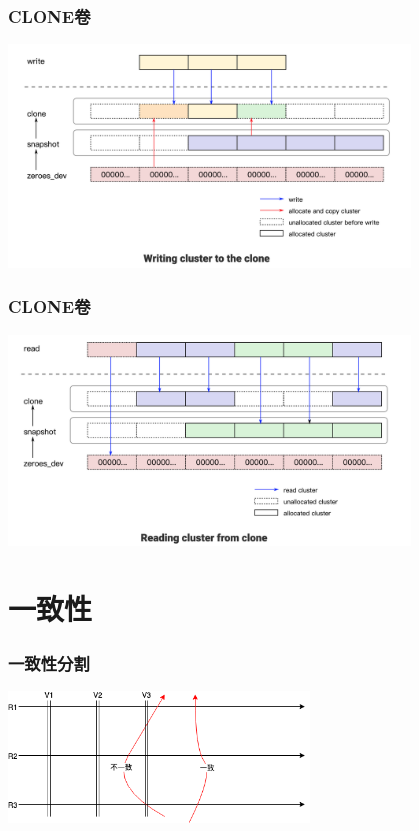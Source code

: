 \documentclass[UTF8,8pt,xcolor=dvipsnames]{beamer}
\begin{document}
\begin{frame}[fragile]
    \frametitle{CLONE卷}
    \begin{center}
        \includegraphics[width=0.8\textwidth]{../imgs/clone-write.png}
    \end{center}
\end{frame}

\begin{frame}[fragile]
    \frametitle{CLONE卷}
    \begin{center}
        \includegraphics[width=0.8\textwidth]{../imgs/clone-read.png}
    \end{center}
\end{frame}

\section{一致性}

\begin{frame}[fragile]
    \frametitle{一致性分割}
    \begin{center}
        \includegraphics[width=0.6\textwidth]{../imgs/consistency-splice.png}
    \end{center}
\end{frame}
\end{document}
